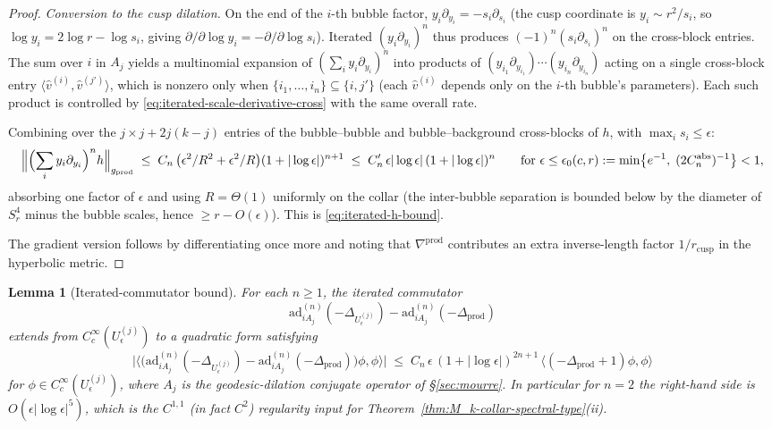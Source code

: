 \documentclass[11pt,letterpaper]{article}
\newtheorem{lemma}[theorem]{Lemma}
\theoremstyle{definition}
\newcommand{\Lap}{\Delta}
\begin{document}
\begin{proof}
\emph{Conversion to the cusp dilation.} On the end of the $i$-th bubble factor, $y_i\partial_{y_i} = -s_i\partial_{s_i}$ (the cusp coordinate is $y_i \sim r^2/s_i$, so $\log y_i = 2\log r - \log s_i$, giving $\partial/\partial\log y_i = -\partial/\partial\log s_i$). Iterated $(y_i\partial_{y_i})^n$ thus produces $(-1)^n (s_i\partial_{s_i})^n$ on the cross-block entries. The sum over $i$ in $A_j$ yields a multinomial expansion of $(\sum_i y_i\partial_{y_i})^n$ into products of $(y_{i_1}\partial_{y_{i_1}})\cdots(y_{i_n}\partial_{y_{i_n}})$ acting on a single cross-block entry $\langle\hat v^{(i)}, \hat v^{(j')}\rangle$, which is nonzero only when $\{i_1,\dots,i_n\}\subseteq\{i,j'\}$ (each $\hat v^{(i)}$ depends only on the $i$-th bubble's parameters). Each such product is controlled by \eqref{eq:iterated-scale-derivative-cross} with the same overall rate.

Combining over the $j\times j + 2j(k-j)$ entries of the bubble--bubble and bubble--background cross-blocks of $h$, with $\max_i s_i \le \epsilon$:
\[
\Bigl\|\Bigl(\sum_i y_i\partial_{y_i}\Bigr)^n h\Bigr\|_{g_{\mathrm{prod}}} \;\le\; C_n\,\bigl(\epsilon^2/R^2 + \epsilon^2/R\bigr)(1+|\log\epsilon|)^{n+1} \;\le\; C'_n\,\epsilon|\log\epsilon|\,(1+|\log\epsilon|)^n
\qquad \text{for } \epsilon \le \epsilon_0(c, r) := \min\bigl\{e^{-1},\; (2 C_n^{\mathrm{abs}})^{-1}\bigr\} < 1,
\]
absorbing one factor of $\epsilon$ and using $R = \Theta(1)$ uniformly on the collar (the inter-bubble separation is bounded below by the diameter of $S^4_r$ minus the bubble scales, hence $\ge r - O(\epsilon)$). This is \eqref{eq:iterated-h-bound}.

The gradient version follows by differentiating once more and noting that $\nabla^{\mathrm{prod}}$ contributes an extra inverse-length factor $1/r_{\mathrm{cusp}}$ in the hyperbolic metric.
\end{proof}

\begin{lemma}[Iterated-commutator bound]\label{app:lem:iterated}
For each $n \ge 1$, the iterated commutator
\[
\mathrm{ad}_{iA_j}^{(n)}(-\Lap_{U_\epsilon^{(j)}}) - \mathrm{ad}_{iA_j}^{(n)}(-\Lap_{\mathrm{prod}})
\]
extends from $C_c^\infty(U_\epsilon^{(j)})$ to a quadratic form satisfying
\begin{equation}\label{eq:iterated-commutator-bound}
\bigl|\bigl\langle\bigl(\mathrm{ad}_{iA_j}^{(n)}(-\Lap_{U_\epsilon^{(j)}}) - \mathrm{ad}_{iA_j}^{(n)}(-\Lap_{\mathrm{prod}})\bigr)\phi,\phi\bigr\rangle\bigr| \;\le\; C_n\,\epsilon\,(1+|\log\epsilon|)^{2n+1}\,\langle(-\Lap_{\mathrm{prod}}+1)\phi,\phi\rangle
\end{equation}
for $\phi \in C_c^\infty(U_\epsilon^{(j)})$, where $A_j$ is the geodesic-dilation conjugate operator of \S\ref{sec:mourre}. In particular for $n=2$ the right-hand side is $O(\epsilon|\log\epsilon|^5)$, which is the $C^{1,1}$ (in fact $C^2$) regularity input for Theorem~\ref{thm:M_k-collar-spectral-type}(ii).
\end{lemma}
\end{document}
